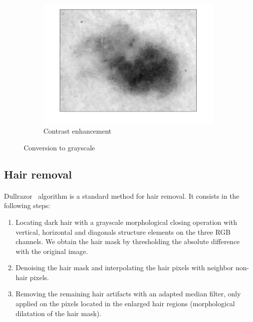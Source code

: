 \documentclass[a4paper,10pt]{article}
\begin{document}
\begin{figure} [h]
\begin{subfigure}{0.32\linewidth}
	\includegraphics[width=0.99\linewidth]{../results/color-channel-influence/dyn_range.png}	  
	\caption{Contrast enhancement}
	\label{fig:grayscale-dyn}
\end{subfigure}
	\caption{Conversion to grayscale}
	\label{fig:grayscale}
\end{figure}

\subsection{Hair removal}
\paragraph{} Dullrazor~\cite{Dullrazor1997} algorithm is a standard method for 
hair removal. It consists in the following steps:
\begin{enumerate}
	\item Locating dark hair with a grayscale morphological closing operation with 
	vertical, horizontal and diagonals structure elements on the three RGB channels. 
	We obtain the hair mask by thresholding the absolute difference with the 
	original image. 
	\item Denoising the hair mask and interpolating the hair pixels with neighbor 
	non-hair pixels. 
	\item Removing the remaining hair artifacts with an adapted median filter, only 
	applied on the pixels located in the enlarged hair regions
	(morphological dilatation of the hair mask).
\end{enumerate}
\end{document}
